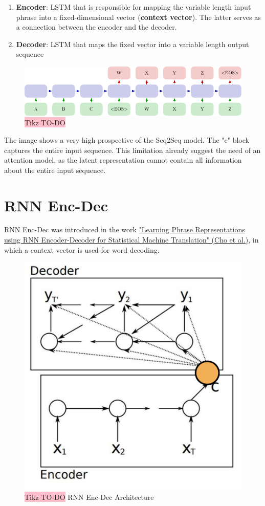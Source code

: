 \begin{enumerate}
    \item \textbf{Encoder}: LSTM that is responsible for mapping the variable length input phrase into a fixed-dimensional vector (\textbf{context vector}). The latter serves as a connection between the encoder and the decoder.
    \item \textbf{Decoder}: LSTM that maps the fixed vector into a variable length output sequence
\end{enumerate}

\begin{figure}[!htbp]
    \centering
    \includegraphics[width=\linewidth]{tikz/chapter7 - Seq2Seq.pdf}
    \caption{{\color{red}\colorbox{pink}{Tikz TO-DO}}}
\end{figure}

The image shows a very high prospective of the Seq2Seq model. The "c" block captures the entire input sequence. This limitation already suggest the need of an attention model, as the latent representation cannot contain all information about the entire input sequence.

\section{RNN Enc-Dec}
RNN Enc-Dec was introduced in the work \href{https://arxiv.org/pdf/1409.3215}{"Learning Phrase Representations using RNN Encoder-Decoder for Statistical Machine Translation" (Cho et al.)}, in which a context vector is used for word decoding.

\begin{figure}[!htbp]
    \centering
    \includegraphics[width=0.45\linewidth]{tikz/chapter7 - RNN Enc-Dec.png}
    \caption{{\color{red}\colorbox{pink}{Tikz TO-DO}}  RNN Enc-Dec Architecture}
\end{figure}

